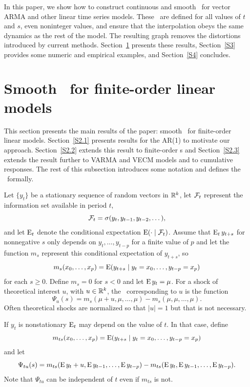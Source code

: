 \documentclass[12pt,fleqn]{article}
\begin{document}
In this paper, we show how to construct continuous and smooth \IRFs\
for vector ARMA and other linear time series models. These \IRFs\ are
defined for all values of $t$ and $s$, even noninteger values, and
ensure that the interpolation obeys the same dynamics as the rest of
the model. The resulting graph removes the distortions introduced by
current methods.  Section~\ref{S2} presents these results,
Section~\ref{S3} provides some numeric and empirical examples, and
Section~\ref{S4} concludes.

\section{Smooth \IRFs\ for finite-order linear models}
\label{S2}

This section presents the main results of the paper: smooth \IRFs\ for
finite-order linear models. Section~\ref{S2.1} presents results for
the AR(1) to motivate our approach. Section~\ref{S2.2} extends this
result to finite-order \VAR s and Section~\ref{S2.3} extends the
result further to VARMA and VECM models and to cumulative responses.
The rest of this subsection introduces some notation and defines the
\IRFs\ formally.

Let $\{y_t\}$ be a stationary sequence of random vectors in $\mathbb{R}^k$,
let $\mathcal{F}_t$ represent the information set available in period $t$,
\begin{equation*}
  \mathcal{F}_t = \sigma(y_t, y_{t-1}, y_{t-2},\dots),
\end{equation*}
and let $\operatorname{E}_t$ denote the conditional expectation
$\operatorname{E}(\cdot \mid \mathcal{F}_t)$. Assume that $\operatorname{E}_t y_{t+s}$ for
nonnegative $s$ only depends on $y_t,\dots,y_{t-p}$ for a finite value
of $p$ and let the function $m_s$ represent this conditional
expectation of $y_{t+s}$, so
\begin{equation*}
  m_s(x_0,\dots,x_p)
  = \operatorname{E}(y_{t+s} \mid y_t = x_0,\dots, y_{t-p} = x_p)
\end{equation*}
for each $s \geq 0$. Define $m_s = 0$ for $s < 0$ and let
$\operatorname{E} y_t = \mu$. For a shock of theoretical interest $u$, with
$u \in \mathbb{R}^k$, the \IRF\ corresponding to $u$ is the function
\[
  \Psi_u(s) =
  m_s(\mu + u, \mu, \dots, \mu) - m_s(\mu, \mu, \dots,\mu).
\]
Often theoretical shocks are normalized so that $\lvert u \rvert = 1$
but that is not necessary.

If $y_t$ is nonstationary $\operatorname{E}_t$ may depend on the value of $t$. In that
case, define
\begin{equation*}
  m_{ts}(x_0,\dots,x_p)
  = \operatorname{E}(y_{t+s} \mid y_t = x_0,\dots, y_{t-p} = x_p)
\end{equation*}
and let
\begin{equation*}
  \Psi_{tu}(s) =
  m_{ts}(\operatorname{E} y_t + u, \operatorname{E} y_{t-1}, \dots, \operatorname{E} y_{t-p}) - m_{ts}(\operatorname{E} y_t, \operatorname{E} y_{t-1}, \dots,\operatorname{E} y_{t-p}).
\end{equation*}
Note that $\Psi_{tu}$ can be independent of $t$ even if $m_{ts}$ is
not.
\end{document}
